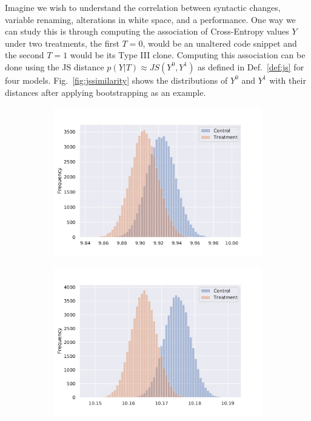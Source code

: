 \begin{exmp}
\label{exmp:js}Imagine we wish to understand the correlation between syntactic changes, \ie variable renaming, alterations in white space, \etc and a \nlms performance. One way we can study this is through computing the association of Cross-Entropy values $Y$ under two treatments, the first $T=0$, would be an unaltered code snippet and the second $T=1$ would be its Type III clone. Computing this association can be done using the JS distance $p(Y|T)\approx JS(Y^0,Y^1)$ as defined in Def.~\ref{def:js} for four models. Fig.~\ref{fig:jssimilarity} shows the distributions of $Y^0$ and $Y^1$ with their distances after applying bootstrapping as an example.

\begin{figure}[th]
  \centering
  \begin{subfigure}[b]{0.46\linewidth}
    \includegraphics[width=\linewidth]{graphics/preliminaries/association/cross-entropy-rnn1-distribution-clone3-300dpi.pdf}
  \end{subfigure}
  \begin{subfigure}[b]{0.46\linewidth}
    \includegraphics[width=\linewidth]{graphics/preliminaries/association/cross-entropy-gru1-distribution-clone3-300dpi.pdf}

\end{subfigure}
\end{figure}
\end{exmp}
